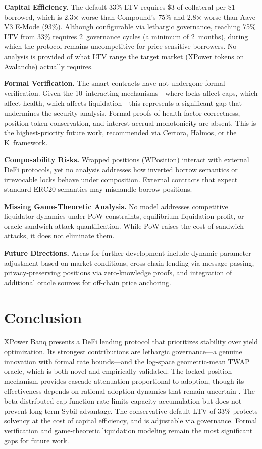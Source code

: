 \documentclass[10pt,a4paper,twocolumn]{article}
\theoremstyle{definition}
\theoremstyle{plain}
\theoremstyle{remark}
\begin{document}
\textbf{Capital Efficiency.} The default 33\% LTV requires \$3 of collateral per \$1 borrowed, which is 2.3$\times$ worse than Compound's 75\% and 2.8$\times$ worse than Aave V3 E-Mode (93\%). Although configurable via lethargic governance, reaching 75\% LTV from 33\% requires 2~governance cycles (a minimum of 2~months), during which the protocol remains uncompetitive for price-sensitive borrowers. No analysis is provided of what LTV range the target market (XPower tokens on Avalanche) actually requires.

\textbf{Formal Verification.} The smart contracts have not undergone formal verification. Given the 10~interacting mechanisms---where locks affect caps, which affect health, which affects liquidation---this represents a significant gap that undermines the security analysis. Formal proofs of health factor correctness, position token conservation, and interest accrual monotonicity are absent. This is the highest-priority future work, recommended via Certora, Halmos, or the K~framework.

\textbf{Composability Risks.} Wrapped positions (WPosition) interact with external DeFi protocols, yet no analysis addresses how inverted borrow semantics or irrevocable locks behave under composition. External contracts that expect standard ERC20 semantics may mishandle borrow positions.

\textbf{Missing Game-Theoretic Analysis.} No model addresses competitive liquidator dynamics under PoW constraints, equilibrium liquidation profit, or oracle sandwich attack quantification. While PoW raises the cost of sandwich attacks, it does not eliminate them.

\textbf{Future Directions.} Areas for further development include dynamic parameter adjustment based on market conditions, cross-chain lending via message passing, privacy-preserving positions via zero-knowledge proofs, and integration of additional oracle sources for off-chain price anchoring.

\section{Conclusion}
\label{sec:conclusion}

XPower Banq presents a DeFi lending protocol that prioritizes stability over yield optimization. Its strongest contributions are lethargic governance---a genuine innovation with formal rate bounds---and the log-space geometric-mean TWAP oracle, which is both novel and empirically validated. The locked position mechanism provides cascade attenuation proportional to adoption, though its effectiveness depends on rational adoption dynamics that remain uncertain \cite[\S C]{apx}. The beta-distributed cap function rate-limits capacity accumulation but does not prevent long-term Sybil advantage. The conservative default LTV of 33\% protects solvency at the cost of capital efficiency, and is adjustable via governance. Formal verification and game-theoretic liquidation modeling remain the most significant gaps for future work.
\end{document}

